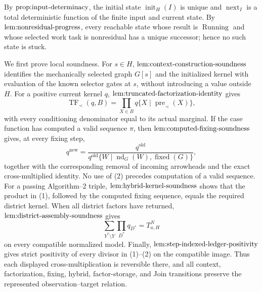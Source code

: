 By \(\textnormal{prop:input-determinacy}\), the initial state \(\operatorname{init}_H(I)\) is unique and \(\operatorname{next}_I\) is a total deterministic function of the finite input and current state.  By \(\textnormal{lem:nonresidual-progress}\), every reachable state whose result is \(\operatorname{Running}\) and whose selected work task is nonresidual has a unique successor; hence no such state is stuck.

We first prove local soundness.  For \(s\in H\), \(\textnormal{lem:context-construction-soundness}\) identifies the mechanically selected graph \(G[s]\) and the initialized kernel with evaluation of the known selector gates at \(s\), without introducing a value outside \(H\).  For a positive current kernel \(q\), \(\textnormal{lem:truncated-factorization-identity}\) gives
\[
 \operatorname{TF}_{\prec}(q,B)
 =\prod_{X\in B}q\{X\mid\operatorname{pre}_{\prec}(X)\},
\tag{1}
\]
with every conditioning denominator equal to its actual marginal.  If the case function has computed a valid sequence \(\pi\), then \(\textnormal{lem:computed-fixing-soundness}\) gives, at every fixing step,
\[
 q^{\mathrm{new}}
 =\frac{q^{\mathrm{old}}}
 {q^{\mathrm{old}}\{W\mid\operatorname{nd}_G(W),\operatorname{fixed}(G)\}},
\tag{2}
\]
together with the corresponding removal of incoming arrowheads and the exact cross-multiplied identity.  No use of (2) precedes computation of a valid sequence.  For a passing Algorithm--2 triple, \(\textnormal{lem:hybrid-kernel-soundness}\) shows that the product in (1), followed by the computed fixing sequence, equals the required district kernel.  When all district factors have returned, \(\textnormal{lem:district-assembly-soundness}\) gives
\[
 \sum_{Y^*\setminus Y}\prod_{D^*}q_{D^*}
 =T_{a,H}^N
\tag{3}
\]
on every compatible normalized model.  Finally, \(\textnormal{lem:step-indexed-ledger-positivity}\) gives strict positivity of every divisor in (1)--(2) on the compatible image.  Thus each displayed cross-multiplication is reversible there, and all context, factorization, fixing, hybrid, factor-storage, and Join transitions preserve the represented observation--target relation.


